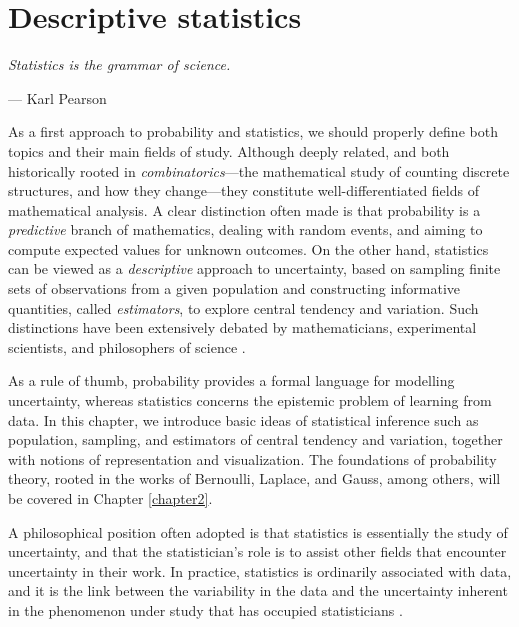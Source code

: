 \chapter{Descriptive statistics}
\label{chapter1}

\epigraph{\textit{Statistics is the grammar of science.}}{— Karl Pearson}

As a first approach to probability and statistics, we should properly define both topics and their main fields of study. Although deeply related, and both historically rooted in \textit{combinatorics}—the mathematical study of counting discrete structures, and how they change—they constitute well-differentiated fields of mathematical analysis. A clear distinction often made is that probability is a \textit{predictive} branch of mathematics, dealing with random events, and aiming to compute expected values for unknown outcomes. On the other hand, statistics can be viewed as a \textit{descriptive} approach to uncertainty, based on sampling finite sets of observations from a given population and constructing informative quantities, called \textit{estimators}, to explore central tendency and variation. Such distinctions have been extensively debated by mathematicians, experimental scientists, and philosophers of science \cite{salmon_1984_scientific}.

\medskip

As a rule of thumb, probability provides a formal language for modelling uncertainty, whereas statistics concerns the epistemic problem of learning from data. In this chapter, we introduce basic ideas of statistical inference such as population, sampling, and estimators of central tendency and variation, together with notions of representation and visualization. The foundations of probability theory, rooted in the works of Bernoulli, Laplace, and Gauss, among others, will be covered in Chapter \ref{chapter2}.

A philosophical position often adopted is that statistics is essentially the study of uncertainty, and that the statistician’s role is to assist other fields that encounter uncertainty in their work. In practice, statistics is ordinarily associated with data, and it is the link between the variability in the data and the uncertainty inherent in the phenomenon under study that has occupied statisticians \cite{glymour_1980_theory}.

\medskip

